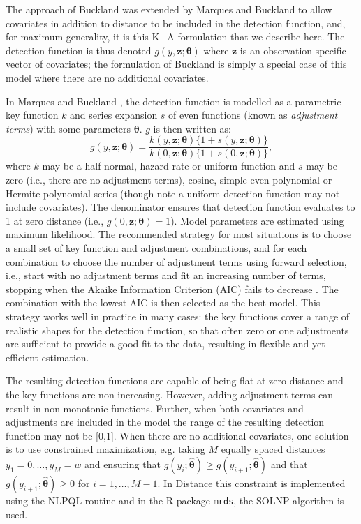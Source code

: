 \documentclass[10pt]{article}
\begin{document}
The approach of Buckland \cite{Buckland:1992wy} was extended by Marques and Buckland \cite{Marques:2003vb} to allow covariates in addition to distance to be included in the detection function, and, for maximum generality, it is this K+A formulation that we describe here.  The detection function is thus denoted $g(y, \mathbf{z};\mathbf{\theta})$ where $\mathbf{z}$ is an observation-specific vector of covariates; the formulation of Buckland \cite{Buckland:1992wy} is simply a special case of this model where there are no additional covariates. 

In Marques and Buckland \cite{Marques:2003vb}, the detection function is modelled as a parametric key function $k$ and series expansion $s$ of even functions (known as \textit{adjustment terms}) with some parameters $\mathbf{\theta}$. $g$ is then written as:
\begin{equation*}
g(y, \mathbf{z}; \mathbf{\theta}) = \frac{k(y, \mathbf{z}; \mathbf{\theta}) \{1+s(y, \mathbf{z}; \mathbf{\theta})\}}{k(0, \mathbf{z}; \mathbf{\theta}) \{1+s(0, \mathbf{z}; \mathbf{\theta})\}},
\end{equation*}
where $k$ may be a half-normal, hazard-rate or uniform function and $s$ may be zero (i.e., there are no adjustment terms), cosine, simple even polynomial or Hermite polynomial series (though note a uniform detection function may not include covariates). The denominator ensures that detection function evaluates to 1 at zero distance (i.e., $g(0, \mathbf{z};\mathbf{\theta})=1$). Model parameters are estimated using maximum likelihood.  The recommended strategy for most situations is to choose a small set of key function and adjustment combinations, and for each combination to choose the number of adjustment terms using forward selection, i.e., start with no adjustment terms and fit an increasing number of terms, stopping when the Akaike Information Criterion (AIC) fails to decrease \cite{Thomas:2010cf}. The combination with the lowest AIC is then selected as the best model. This strategy works well in practice in many cases: the key functions cover a range of realistic shapes for the detection function, so that often zero or one adjustments are sufficient to provide a good fit to the data, resulting in flexible and yet efficient estimation. 

The resulting detection functions are capable of being flat at zero distance and the key functions are non-increasing. However, adding adjustment terms can result in non-monotonic functions. Further, when both covariates and adjustments are included in the model the range of the resulting detection function may not be [0,1]. When there are no additional covariates, one solution is to use constrained maximization, e.g. taking $M$ equally spaced distances $y_1=0, \ldots , y_{M}=w$ and ensuring that $g(y_i;\mathbf{\hat{\theta}})\geq g(y_{i+1}; \mathbf{\hat{\theta}})$ and that $g(y_{i+1};\mathbf{\hat{\theta}})\geq 0$ for $i=1,\ldots,M-1$. In Distance this constraint is implemented using the NLPQL routine \cite{Schittkowski:1986wj} and in the \textsf{R} package \texttt{mrds}, the SOLNP algorithm \cite{Ye:1987wt} is used.
\end{document}
